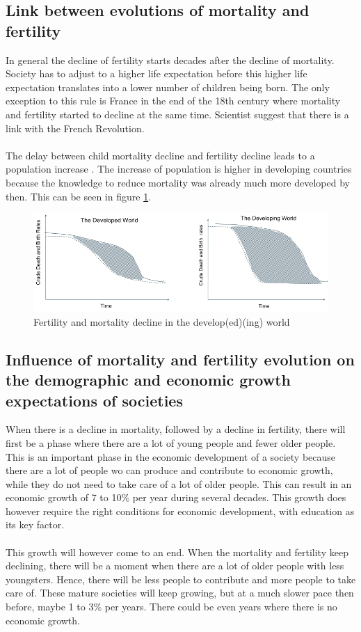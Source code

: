 \documentclass[../summary.tex]{subfiles}
\begin{document}
	\subsection{Link between evolutions of mortality and fertility}
	In general the decline of fertility starts decades after the decline of mortality. Society has to adjust to a higher life expectation before this higher life expectation translates into a lower number of children being born. The only exception to this rule is France in the end of the 18th century where mortality and fertility started to decline at the same time. Scientist suggest that there is a link with the French Revolution. 
	\\
	\\
	The delay between child mortality decline and fertility decline leads to a population increase . The increase of population is higher in developing countries because the knowledge to reduce mortality  was already much more developed by then. This can be seen in figure \ref{fig:fertility-and-mortality-decline}.
	
	\begin{figure}[H]
		\centering
		\includegraphics[width=0.7\linewidth]{../images/3-fertility-and-mortality-decline.png}
		\caption{Fertility and mortality decline in the develop(ed)(ing) world}
		\label{fig:fertility-and-mortality-decline}
	\end{figure}
	
	
	\subsection{Influence of mortality and fertility evolution on the demographic and economic growth expectations of societies}
	When there is a decline in mortality, followed by a decline in fertility, there will first be a phase where there are a lot of young people and fewer older people. This is an important phase in the economic development of a society because there are a lot of people wo can produce and contribute to economic growth, while they do not need to take care of a lot of older people. This can result in an economic growth of 7 to 10\% per year during several decades. This growth does however require the right conditions for economic development, with education as its key factor.
	\\
	\\
	This growth will however come to an end. When the mortality and fertility keep declining, there will be a moment when there are a lot of older people with less youngsters. Hence, there will be less people to contribute and more people to take care of. These mature societies will keep growing, but at a much slower pace then before, maybe 1 to 3\% per years. There could be even years where there is no economic growth.
	
\end{document}
